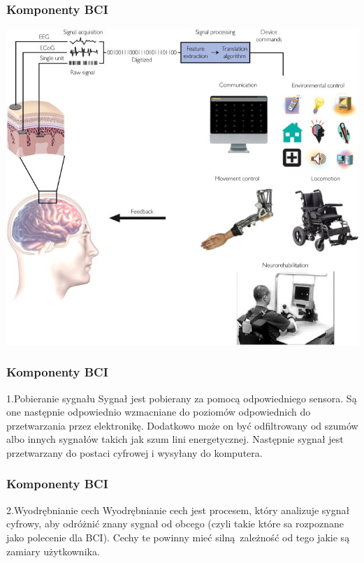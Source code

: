 \documentclass{beamer}
\begin{document}
\begin{frame}
    \frametitle{Komponenty BCI}
    \begin{center}
        \includegraphics[scale=0.5]{comp.jpg}
    \end{center}    
\end{frame}

\begin{frame}
    \frametitle{Komponenty BCI}
    \begin{block}{1.Pobieranie sygnału}
        Sygnał jest pobierany za pomocą odpowiedniego sensora. Są one następnie odpowiednio wzmacniane do poziomów
        odpowiednich do przetwarzania przez elektronikę. Dodatkowo może on być odfiltrowany od szumów albo innych 
        sygnałów takich jak szum lini energetycznej. Następnie sygnał jest przetwarzany do postaci cyfrowej i wysyłany do komputera.   
    \end{block}
\end{frame}

\begin{frame}
    \frametitle{Komponenty BCI}
    \begin{block}{2.Wyodrębnianie cech}
        Wyodrębnianie cech jest procesem, który analizuje sygnał cyfrowy, aby odróżnić znany sygnał od obcego (czyli takie które sa rozpoznane jako polecenie
        dla BCI). Cechy te powinny mieć silną zależność od tego jakie są zamiary użytkownika. 
    \end{block}
\end{frame}
\end{document}
